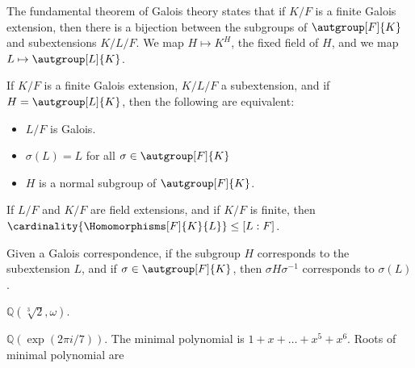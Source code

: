\documentclass{article}                                                        %
\begin{document}
        The fundamental theorem of Galois theory states that if $K/F$ is a
        finite Galois extension, then there is a bijection between the subgroups
        of $\autgroup[F]{K}$ and subextensions $K/L/F$. We map
        $H\mapsto{K}^{H}$, the fixed field of $H$, and we map
        $L\mapsto\autgroup[L]{K}$.
        \begin{theorem}
            If $K/F$ is a finite Galois extension, $K/L/F$ a subextension, and
            if $H=\autgroup[L]{K}$, then the following are equivalent:
            \begin{itemize}
                \item $L/F$ is Galois.
                \item $\sigma(L)=L$ for all $\sigma\in\autgroup[F]{K}$
                \item $H$ is a normal subgroup of $\autgroup[F]{K}$.
            \end{itemize}
        \end{theorem}
        \begin{theorem}
            If $L/F$ and $K/F$ are field extensions, and if $K/F$ is finite,
            then $\cardinality{\Homomorphisms[F]{K}{L}}\leq[L:F]$.
        \end{theorem}
        \begin{theorem}
            Given a Galois correspondence, if the subgroup $H$ corresponds to
            the subextension $L$, and if $\sigma\in\autgroup[F]{K}$, then
            $\sigma{H}\sigma^{\minus{1}}$ corresponds to $\sigma(L)$.
        \end{theorem}
        \begin{example}
            $\mathbb{Q}(\sqrt[3]{2},\omega)$.
        \end{example}
        \begin{example}
            $\mathbb{Q}(\exp(2\pi{i}/7))$. The minimal polynomial is
            $1+x+\dots+x^{5}+x^{6}$. Roots of minimal polynomial are 
        \end{example}
\end{document}
